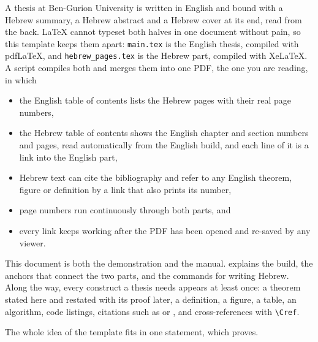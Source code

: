 

A thesis at Ben-Gurion University is written in English and bound with a Hebrew summary, a Hebrew abstract and a Hebrew cover at its end, read from the back.
LaTeX cannot typeset both halves in one document without pain, so this template keeps them apart: \texttt{main.tex} is the English thesis, compiled with pdfLaTeX, and \texttt{hebrew\_pages.tex} is the Hebrew part, compiled with XeLaTeX.
A script compiles both and merges them into one PDF, the one you are reading, in which

\begin{itemize}
    \item the English table of contents lists the Hebrew pages with their real page numbers,
    \item the Hebrew table of contents shows the English chapter and section numbers and pages, read automatically from the English build, and each line of it is a link into the English part,
    \item Hebrew text can cite the bibliography and refer to any English theorem, figure or definition by a link that also prints its number,
    \item page numbers run continuously through both parts, and
    \item every link keeps working after the PDF has been opened and re-saved by any viewer.
\end{itemize}

This document is both the demonstration and the manual.
 explains the build,  the anchors that connect the two parts, and  the commands for writing Hebrew.
Along the way, every construct a thesis needs appears at least once: a theorem stated here and restated with its proof later, a definition, a figure, a table, an algorithm, code listings, citations such as \cite{Karp72,GJ79} or \cite{downey2013fundamentals,cygan2015parameterized}, and cross-references with \verb|\Cref|.

The whole idea of the template fits in one statement, which  proves.

